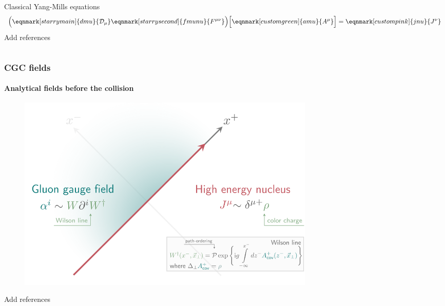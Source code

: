 \documentclass[aspectratio=169,11pt,usenames,dvipsnames]{beamer}
\begin{document}
\begin{frame}[noframenumbering]
\begin{columns}[onlytextwidth,t]
\begin{center}
\begin{figure}[!hbt]
                \captionsetup{justification=centering}
                \vspace{-0.2em}
            \end{figure}
            \footnotesize
            \vspace{-10pt}
            Classical Yang-Mills equations\\[20pt]
            \renewcommand{\eqnhighlightheight}{\vphantom{\mathcal{D}_\mu}\mathstrut}\begin{equation*}
                \Big(\eqnmark[starrymain]{dmu}{\mathcal{D}_\mu}\eqnmark[starrysecond]{fmunu}{F^{\mu\nu}}\Big)\Big[\eqnmark[customgreen]{amu}{A^\mu}\Big]=\eqnmark[custompink]{jnu}{J^\nu}
                \end{equation*}
                {\footnotesize\color{red}Add references}
        \end{center}
    \end{columns}
\end{frame}

\begin{frame}
    \frametitle{CGC fields}
    \framesubtitle{Analytical fields before the collision}
    \begin{figure}[!hbt]
        \centering
    	\includegraphics[width=0.7\textwidth]{images/cgc_nuclei.png}
        \captionsetup{justification=centering}
    \end{figure}
    {\footnotesize\color{red}Add references}
\end{frame}
\end{document}
